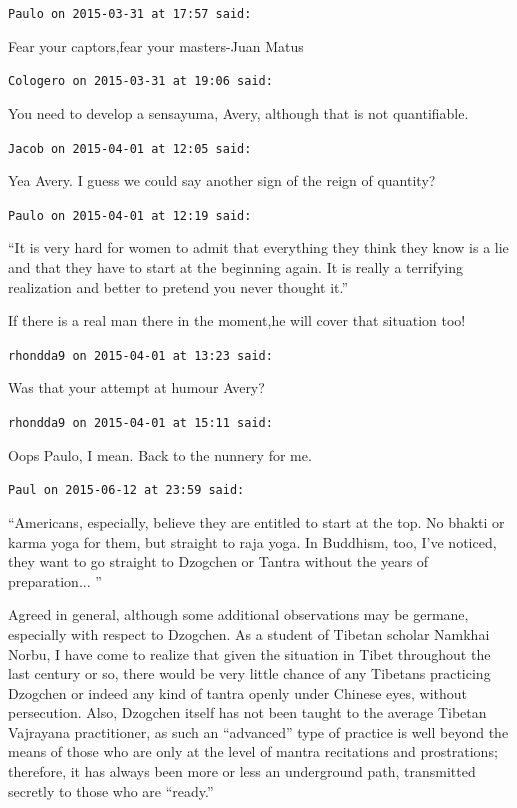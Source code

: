 \begin{footnotesize}
\begin{sffamily}
\texttt{Paulo on 2015-03-31 at 17:57 said:}

Fear your captors,fear your masters-Juan Matus

\hfill

\texttt{Cologero on 2015-03-31 at 19:06 said:}

You need to develop a sensayuma, Avery, although that is not quantifiable.

\hfill

\texttt{Jacob on 2015-04-01 at 12:05 said:}

Yea Avery. I guess we could say another sign of the reign of quantity?

\hfill

\texttt{Paulo on 2015-04-01 at 12:19 said:}

``It is very hard for women to admit that everything they think they know is a lie and that they have to start at the beginning again. It is really a terrifying realization and better to pretend you never thought it.''

If there is a real man there in the moment,he will cover that situation too!

\hfill

\texttt{rhondda9 on 2015-04-01 at 13:23 said:}

Was that your attempt at humour Avery?

\hfill

\texttt{rhondda9 on 2015-04-01 at 15:11 said:}

Oops Paulo, I mean. Back to the nunnery for me.

\hfill

\texttt{Paul on 2015-06-12 at 23:59 said:}

``Americans, especially, believe they are entitled to start at the top. No bhakti or karma yoga for them, but straight to raja yoga. In Buddhism, too, I've noticed, they want to go straight to Dzogchen or Tantra without the years of preparation... ''

Agreed in general, although some additional observations may be germane, especially with respect to Dzogchen. As a student of Tibetan scholar Namkhai Norbu, I have come to realize that given the situation in Tibet throughout the last century or so, there would be very little chance of any Tibetans practicing Dzogchen or indeed any kind of tantra openly under Chinese eyes, without persecution. Also, Dzogchen itself has not been taught to the average Tibetan Vajrayana practitioner, as such an ``advanced'' type of practice is well beyond the means of those who are only at the level of mantra recitations and prostrations; therefore, it has always been more or less an underground path, transmitted secretly to those who are ``ready.''


\end{sffamily}
\end{footnotesize}
